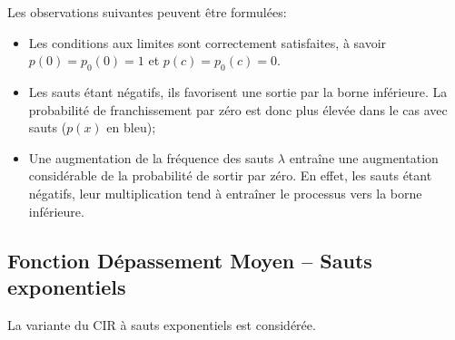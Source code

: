Les observations suivantes peuvent être formulées:
\begin{itemize}
    \item Les conditions aux limites sont correctement satisfaites, à savoir \( p(0) = p_0(0) = 1 \) et \( p(c) = p_0(c) = 0 \).
    \item Les sauts étant négatifs, ils favorisent une sortie par la borne inférieure. La probabilité de franchissement par zéro est donc plus élevée dans le cas avec sauts ($p(x)$ en bleu);
    \item Une augmentation de la fréquence des sauts $\lambda$ entraîne une augmentation considérable de la probabilité de sortir par zéro. En effet, les sauts étant négatifs, leur multiplication tend à entraîner le processus vers la borne inférieure.
\end{itemize}

\subsection{Fonction Dépassement Moyen -- Sauts exponentiels}
La variante du \acs{CIR} à sauts exponentiels est considérée.
